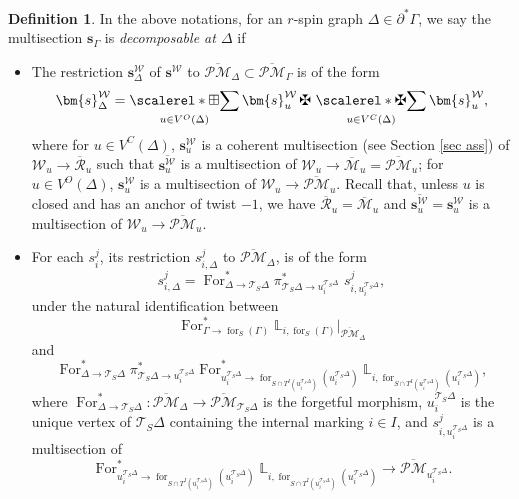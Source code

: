 \documentclass[11pt]{amsart}
\theoremstyle{definition}
\newtheorem{dfn}[dummy]{Definition}
\theoremstyle{remark}
\newcommand{\Ass}{{{\,\maltese\,}}}
\newcommand{\oPMb}{{\overline{\mathcal{PM}}}}
\newcommand{\<}{\left<}
\renewcommand{\>}{\right>}
\numberwithin{equation}{section}
\def\Mbar{{\overline{\mathcal M}}}
\DeclareMathOperator*{\bboxplus}{\scalerel*{\boxplus}{\sum}}
\DeclareMathOperator*{\bass}{\scalerel*{\maltese}{\sum}}
\begin{document}
    \begin{dfn}
        In the above notations, for an $r$-spin graph $\Delta \in \partial^*\Gamma$, we say the multisection $\bm{s}_{\Gamma}$ is \textit{decomposable at $\Delta$} if 
        \begin{itemize}
            \item  The restriction $\bm{s}^{\mathcal W}_{\Delta}$ of $\bm{s}^{\mathcal W}$ to $\oPMb_\Delta\subset \oPMb_\Gamma$ is of the form 
    \begin{equation}\label{eq definition of decomposable of Witten}
        \bm{s}^{\mathcal W}_{\Delta}= \bboxplus_{u\in V^O(\Delta)} \bm{s}_u^{\mathcal W}\Ass\bass_{u\in V^C(\Delta)}\bm{s}_u^{\mathcal W},
    \end{equation}
    where for $u\in V^C(\Delta)$, $\bm{s}_u^{\mathcal W}$ is a coherent multisection (see Section \ref{sec ass}) of $\mathcal W_u\to \overline{\mathcal R}_u$ such that $\overline{\bm{s}_u^{\mathcal W}}$ is a multisection of $\mathcal W_u\to \Mbar_u=\oPMb_u$; for $u\in V^O(\Delta)$, $\bm{s}_u^{\mathcal W}$ is a multisection of $\mathcal W_u\to \oPMb_u$. Recall that, unless $u$ is closed and has an anchor of twist $-1$, we have $\overline{\mathcal R}_u=\Mbar_u$ and $\overline{\bm{s}_u^{\mathcal W}}=\bm{s}_u^{\mathcal W}$ is a  multisection of $\mathcal W_u\to \oPMb_u$. 
            
    \item
    For each $s^j_i$, its restriction $s^j_{i,\Delta}$ to $\oPMb_\Delta$, is of the form
    \begin{equation}\label{eq definition of decomposable of section of Li}
        s^j_{i,\Delta}=\operatorname{For}^*_{\Delta\to \mathcal T_S \Delta}\pi^*_{\mathcal T_S \Delta \to u^{\mathcal T_S \Delta}_{i}} \,\,s^j_{i,u^{\mathcal T_S \Delta}_{i}},
    \end{equation}
    under the natural identification between $$\operatorname{For}^*_{\Gamma \to \operatorname{for}_{S}(\Gamma)}{{\mathbb L}}_{i,\operatorname{for}_{S}(\Gamma)}\big\vert_{\oPMb_{\Delta}}$$ 
    and 
    $$\operatorname{For}^*_{\Delta\to \mathcal T_S \Delta}\pi^*_{\mathcal T_S \Delta \to u^{\mathcal T_S \Delta}_{i}}\operatorname{For}^*_{u^{\mathcal T_S \Delta}_{i} \to \operatorname{for}_{S\cap T^I(u^{\mathcal T_S \Delta}_{i})}(u^{\mathcal T_S \Delta}_{i})}\mathbb L_{i,\operatorname{for}_{S\cap T^I(u^{\mathcal T_S \Delta}_{i})}(u^{\mathcal T_S \Delta}_{i})},$$ 
    where $\operatorname{For}^*_{\Delta\to \mathcal T_S \Delta}\colon \oPMb_{\Delta}\to \oPMb_{\mathcal T_S \Delta}$ is the forgetful morphism, $u^{\mathcal T_S \Delta}_{i}$ is the unique vertex of $\mathcal T_S \Delta$ containing the internal marking $i\in I$, 
    and $s^j_{i,u^{\mathcal T_S\Delta}_{i}}$ is a multisection of
    $$\operatorname{For}^*_{u^{\mathcal T_S \Delta}_{i} \to \operatorname{for}_{S\cap T^I(u^{\mathcal T_S \Delta}_{i})}(u^{\mathcal T_S \Delta}_{i})}\mathbb L_{i,\operatorname{for}_{S\cap T^I(u^{\mathcal T_S \Delta}_{i})}(u^{\mathcal T_S \Delta}_{i})}\to \oPMb_{u^{\mathcal T_S \Delta}_{i}}.$$


\end{itemize}
\end{dfn}
\end{document}
